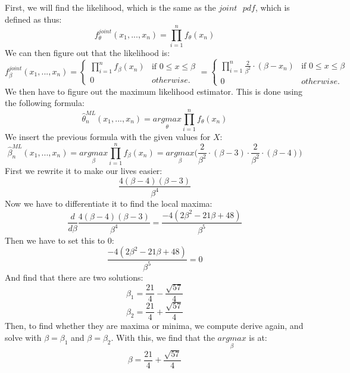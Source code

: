 First, we will find the likelihood, which is the same as the $joint \text{ }pdf$, which is defined as thus:
$$
f_{\theta}^{joint}(x_1,...,x_n) = \prod_{i = 1}^n f_\theta(x_n)
$$
We can then figure out that the likelihood is:
$$
f_{\beta}^{joint}(x_1,...,x_n) = 
\left\{
\begin{matrix}
\prod_{i = 1}^n f_\beta(x_n) & \text{if }0 \leq x \leq \beta \\
0 & otherwise.
\end{matrix}
\right.
=
\left\{
\begin{matrix}
\prod_{i = 1}^n \frac{2}{\beta^2} \cdot (\beta - x_n) & \text{if }0 \leq x \leq \beta \\
0 & otherwise.
\end{matrix}
\right.
$$
We then have to figure out the maximum likelihood estimator. This is done using the following formula:
$$
\hat\theta_n^{ML}(x_1,...,x_n) = \underset{\theta}{argmax}\prod_{i=1}^n f_\theta(x_n)
$$
We insert the previous formula with the given values for $X$:
$$
\hat\beta_n^{ML}(x_1,...,x_n) = \underset{\beta}{argmax}\prod_{i=1}^n f_\beta(x_n) = \underset{\beta}{argmax}\Bigg(\frac{2}{\beta^2} \cdot (\beta - 3) \cdot \frac{2}{\beta^2} \cdot (\beta - 4)\Bigg)
$$
First we rewrite it to make our lives easier:
$$
\frac{4(\beta-4)(\beta-3)}{\beta^4}
$$
Now we have to differentiate it to find the local maxima:
$$
\frac{d}{d\beta} \frac{4(\beta-4)(\beta-3)}{\beta^4} = \frac{-4(2\beta^2-21\beta+48)}{\beta^5}
$$
Then we have to set this to $0$:
$$
\frac{-4(2\beta^2-21\beta+48)}{\beta^5} = 0
$$
And find that there are two solutions:
$$
\beta_1 = \frac{21}{4}-\frac{\sqrt{57}}{4}
$$
$$
\beta_2 = \frac{21}{4}+\frac{\sqrt{57}}{4}
$$
Then, to find whether they are maxima or minima, we compute derive again, and solve with $\beta = \beta_1$ and $\beta = \beta_2$. With this, we find that the $\underset{\beta}{argmax}$ is at:
$$
\beta = \frac{21}{4}+\frac{\sqrt{57}}{4}
$$